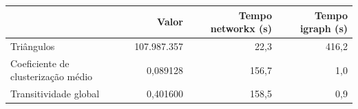 \begin{tabular}{lrrr}
\toprule
 & Valor & Tempo networkx (s) & Tempo igraph (s) \\
\midrule
Triângulos & 107.987.357 & 22,3 & 416,2 \\
Coeficiente de clusterização médio & 0,089128 & 156,7 & 1,0 \\
Transitividade global & 0,401600 & 158,5 & 0,9 \\
\bottomrule
\end{tabular}
